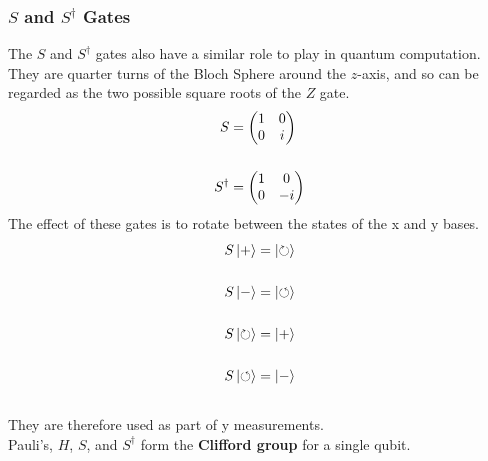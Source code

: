\documentclass[hidelinks, a4paper, 12pt]{article}
\newcommand{\bd}{\textbf}
\newcommand{\n}{\\[\baselineskip]}
\begin{document}
            \subsubsection{\texorpdfstring{$S$}{S} and \texorpdfstring{$S^\dagger$}{S+} Gates}
                The $S$ and $S^\dagger$ gates also have a similar role to play in quantum computation.\n
                They are quarter turns of the Bloch Sphere around the $z$-axis, and so can be regarded as the two possible square roots of the $Z$ gate.
                \[\begin{split}
                    S &= \begin{pmatrix} 1 & 0 \\ 0 & i \end{pmatrix}\n
                    S^\dagger &= \begin{pmatrix} 1 & 0 \\ 0 & -i \end{pmatrix}
                \end{split}\]
                The effect of these gates is to rotate between the states of the x and y bases.
                \[\begin{split}
                    S\ket{+} &= \ket{\circlearrowright}\n
                    S\ket{-} &= \ket{\circlearrowleft}\n
                    S\ket{\circlearrowright} &= \ket{+}\n
                    S\ket{\circlearrowleft} &= \ket{-}\n
                \end{split}\]
                They are therefore used as part of y measurements.\n
                Pauli's, $H$, $S$, and $S^\dagger$ form the \bd{Clifford group} for a single qubit.
\end{document}
